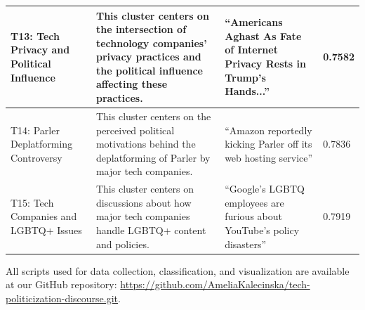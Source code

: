 \begin{longtable}{|p{3cm}|p{5cm}|p{4cm}|p{4cm}|}
\hline
T13: Tech Privacy and Political Influence & This cluster centers on the intersection of technology companies' privacy practices and the political influence affecting these practices. & “Americans Aghast As Fate of Internet Privacy Rests in Trump's Hands...” & 0.7582\\  
\hline
T14: Parler Deplatforming Controversy & This cluster centers on the perceived political motivations behind the deplatforming of Parler by major tech companies. & “Amazon reportedly kicking Parler off its web hosting service” & 0.7836\\ 
\hline
T15: Tech Companies and LGBTQ+ Issues & This cluster centers on discussions about how major tech companies handle LGBTQ+ content and policies. & “Google’s LGBTQ employees are furious about YouTube’s policy disasters” & 0.7919\\ 
\hline
\end{longtable}

All scripts used for data collection, classification, and visualization are available at our GitHub repository: \url{https://github.com/AmeliaKalecinska/tech-politicization-discourse.git}.